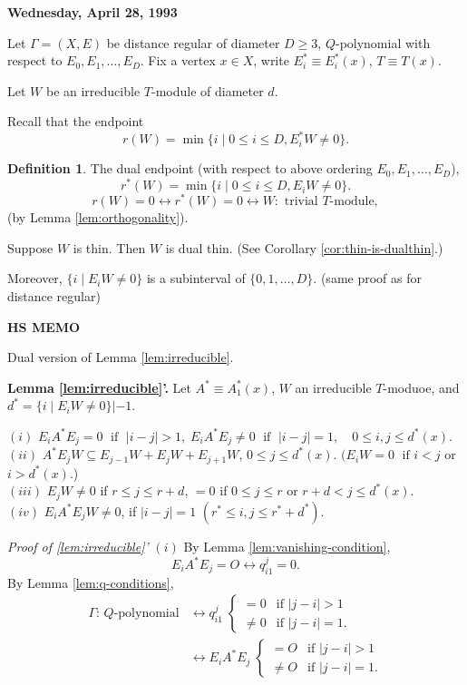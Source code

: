 \documentclass[
]{book}
\theoremstyle{definition}
\newtheorem{definition}{Definition}[chapter]
\theoremstyle{definition}
\theoremstyle{definition}
\theoremstyle{definition}
\theoremstyle{remark}
\begin{document}
\textbf{Wednesday, April 28, 1993}

Let \(\Gamma = (X, E)\) be distance regular of diameter \(D\geq 3\), \(Q\)-polynomial with respect to \(E_0, E_1, \ldots, E_D\). Fix a vertex \(x\in X\), write \(E^*_i\equiv E^*_i(x)\), \(T\equiv T(x)\).

Let \(W\) be an irreducible \(T\)-module of diameter \(d\).

Recall that the endpoint
\[r(W) = \min\{i\mid 0\leq i\leq D, E^*_iW \neq 0\}.\]

\begin{definition}
\protect\hypertarget{def:dual-endpoint}{}\label{def:dual-endpoint}The dual endpoint  (with respect to above ordering \(E_0, E_1, \ldots, E_D\)),
\[r^*(W) = \min\{i\mid 0\leq i\leq D, E_iW \neq 0\}.\]
\[r(W) = 0 \leftrightarrow r^*(W) = 0 \leftrightarrow W: \text{ trivial $T$-module},\]
(by Lemma \ref{lem:orthogonality}).
\end{definition}

Suppose \(W\) is thin. Then \(W\) is dual thin.
(See Corollary \ref{cor:thin-is-dualthin}.)

Moreover, \(\{i\mid E_iW \neq 0\}\) is a subinterval of \(\{0, 1, \ldots, D\}\). (same proof as for distance regular)

\textbf{HS MEMO}

Dual version of Lemma \ref{lem:irreducible}.

\textbf{Lemma \ref{lem:irreducible}'.}
Let \(A^* \equiv A^*_1(x)\), \(W\) an irreducible \(T\)-moduoe, and \(d^* = \{i\mid E_iW\neq 0\}|-1\).

\((i)\) \(E_iA^*E_j = 0 \; \text{ if }\; |i-j|>1, \; E_iA^*E_j\neq 0 \; \text{ if }\; |i-j| = 1, \quad 0\leq i,j\leq d^*(x)\).\\
\((ii)\) \(A^*E_jW \subseteq E_{j-1}W + E_jW + E_{j+1}W\), \(0\leq j \leq d^*(x)\). \((E_iW = 0 \; \text{ if } i<j\) or \(i > d^*(x)\).)\\
\((iii)\) \(E_jW \neq 0\) if \(r\leq j \leq r+d\), \(=0\) if \(0\leq j\leq r\) or \(r+d < j \leq d^*(x)\).\\
\((iv)\) \(E_iA^*E_jW \neq 0\), if \(|i-j| = 1\) \((r^* \leq i,j \leq r^*+d^*)\).

\emph{Proof of \ref{lem:irreducible}'}
\textbar{} \((i)\) By Lemma \ref{lem:vanishing-condition},
\[E_iA^*E_j = O \leftrightarrow q^j_{i1} = 0.\]
By Lemma \ref{lem:q-conditions},
\begin{align}
\Gamma\text{: $Q$-polynomial} &\leftrightarrow q^j_{i1} \;\begin{cases} = 0 & \text{if }|j-i|>1\\
\neq 0 & \text{if }|j-i|=1.\end{cases}\\
& \leftrightarrow E_iA^*E_j \;\begin{cases} = O & \text{if }|j-i|>1\\
\neq O & \text{if }|j-i|=1.\end{cases}
\end{align}
\end{document}
